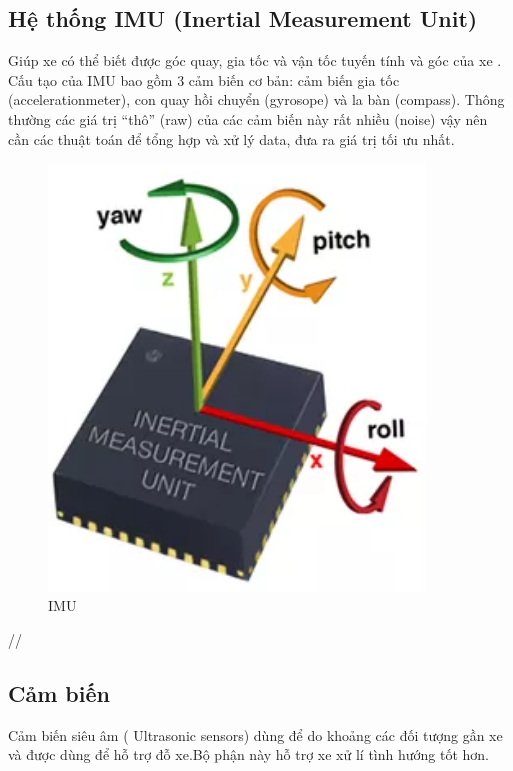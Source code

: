 \documentclass{article}
\begin{document}
\subsection{Hệ thống IMU (Inertial Measurement Unit)}
Giúp xe có thể biết được góc quay, gia tốc và vận tốc tuyến tính và góc của xe . Cấu tạo của IMU bao gồm 3 cảm biến cơ bản: cảm biến gia tốc (accelerationmeter), con quay hồi chuyển (gyrosope) và la bàn (compass). Thông thường các giá trị “thô” (raw) của các cảm biến này rất nhiều (noise) vậy nên cần các thuật toán để tổng hợp và xử lý data, đưa ra giá trị tối ưu nhất.
\begin{figure}[h]
\centering 
\includegraphics[width=100mm]{3.png} 
\caption{IMU} 
\label{dinhnghia} 
\end{figure}//

\subsection{Cảm biến}
Cảm biến siêu âm ( Ultrasonic sensors) dùng để do khoảng các đối tượng gần xe và được dùng để hỗ trợ đỗ xe.Bộ phận này hỗ trợ xe xử lí tình hướng tốt hơn.
\end{document}
